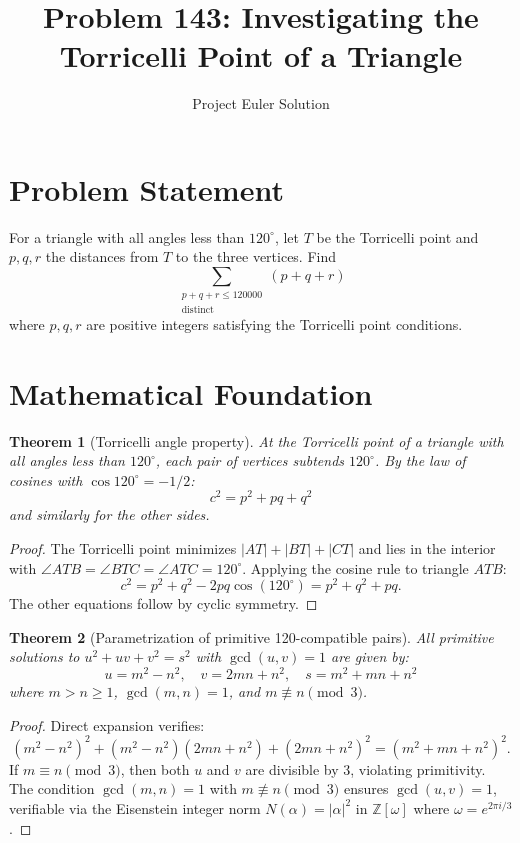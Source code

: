 \documentclass[12pt]{article}
\title{Problem 143: Investigating the Torricelli Point of a Triangle}
\author{Project Euler Solution}
\date{}
\newtheorem{theorem}{Theorem}
\begin{document}
\maketitle

\section{Problem Statement}
For a triangle with all angles less than $120^\circ$, let $T$ be the Torricelli point and $p, q, r$ the distances from $T$ to the three vertices. Find
\[
\sum_{\substack{p+q+r \le 120000 \\ \text{distinct}}} (p+q+r)
\]
where $p, q, r$ are positive integers satisfying the Torricelli point conditions.

\section{Mathematical Foundation}

\begin{theorem}[Torricelli angle property]
At the Torricelli point of a triangle with all angles less than $120^\circ$, each pair of vertices subtends $120^\circ$. By the law of cosines with $\cos 120^\circ = -1/2$:
\[
c^2 = p^2 + pq + q^2
\]
and similarly for the other sides.
\end{theorem}

\begin{proof}
The Torricelli point minimizes $|AT|+|BT|+|CT|$ and lies in the interior with $\angle ATB = \angle BTC = \angle ATC = 120^\circ$. Applying the cosine rule to triangle $ATB$:
\[
c^2 = p^2 + q^2 - 2pq\cos(120^\circ) = p^2 + q^2 + pq.
\]
The other equations follow by cyclic symmetry.
\end{proof}

\begin{theorem}[Parametrization of primitive 120-compatible pairs]
All primitive solutions to $u^2 + uv + v^2 = s^2$ with $\gcd(u,v) = 1$ are given by:
\[
u = m^2 - n^2, \quad v = 2mn + n^2, \quad s = m^2 + mn + n^2
\]
where $m > n \geq 1$, $\gcd(m,n) = 1$, and $m \not\equiv n \pmod{3}$.
\end{theorem}

\begin{proof}
Direct expansion verifies:
\[
(m^2-n^2)^2 + (m^2-n^2)(2mn+n^2) + (2mn+n^2)^2 = (m^2+mn+n^2)^2.
\]
If $m \equiv n \pmod{3}$, then both $u$ and $v$ are divisible by 3, violating primitivity. The condition $\gcd(m,n) = 1$ with $m \not\equiv n \pmod{3}$ ensures $\gcd(u,v) = 1$, verifiable via the Eisenstein integer norm $N(\alpha) = |\alpha|^2$ in $\mathbb{Z}[\omega]$ where $\omega = e^{2\pi i/3}$.
\end{proof}
\end{document}
